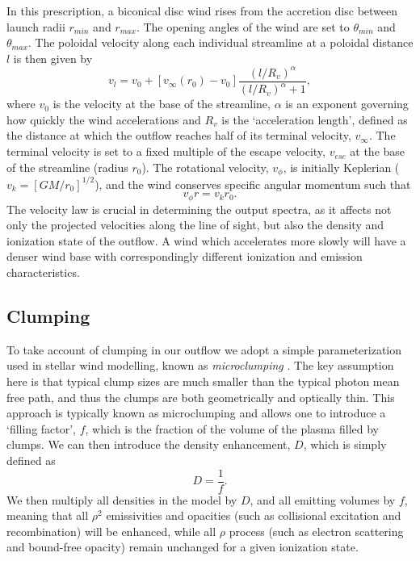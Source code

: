 \documentclass[preprint, a4paper, 11pt]{aastex}
\begin{document}
In this prescription, a biconical disc wind rises from the accretion 
disc between launch radii $r_{min}$ and $r_{max}$.
The opening angles of the wind are set to $\theta_{min}$ and $\theta_{max}$.
The poloidal velocity along each individual streamline at a poloidal distance $l$ 
is then given by
\begin{equation}
v_l=v_0+\left[v_{\infty}(r_0)-v_0\right]\frac{\left(l/R_v\right)^{\alpha}}{\left(l/R_v\right)^{\alpha}+1},
\label{v_law}
\end{equation}
where $v_0$ is the velocity at the base of the streamline, $\alpha$ is
an exponent governing how quickly the wind accelerations and 
$R_v$ is the `acceleration length', defined as the distance at which
the outflow reaches half of its terminal velocity, $v_{\infty}$.
The terminal velocity is set to a fixed multiple of the escape
velocity, $v_{esc}$ at the base of the streamline (radius $r_0$).
The rotational velocity, $v_{\phi}$, is initially Keplerian ($v_k = [GM/r_0]^{1/2}$),
and the wind conserves specific angular momentum such that 
\begin{equation}
v_{\phi} r = v_k r_0.
\label{v_law}
\end{equation}
The velocity law is crucial in determining the output spectra,
as it affects not only the projected velocities along the line of sight,
but also the density and ionization state of the outflow.
A wind which accelerates more slowly will have a denser wind base
with correspondingly different ionization and emission characteristics.



\subsection{Clumping}

To take account of clumping in our outflow we adopt a simple parameterization
used in stellar wind modelling, known as {\em microclumping} \citep{hamann1998}. 
The key assumption here is that typical clump sizes
are much smaller than the typical photon mean free path, and thus the clumps are 
both geometrically and optically thin. This approach is typically 
known as microclumping and allows one to introduce a `filling factor', $f$, which is the 
fraction of the volume of the plasma filled by clumps. We can then introduce the 
density enhancement, $D$, which is simply defined as 
\begin{equation}
D = \frac{1}{f}.
\end{equation}
We then multiply all densities in the model by $D$, and all emitting volumes
by $f$, meaning that all $\rho^2$ emissivities and opacities
(such as collisional excitation and recombination) will be enhanced, 
while all $\rho$ process (such as electron scattering and bound-free opacity)
remain unchanged for a given ionization state. 
\end{document}
